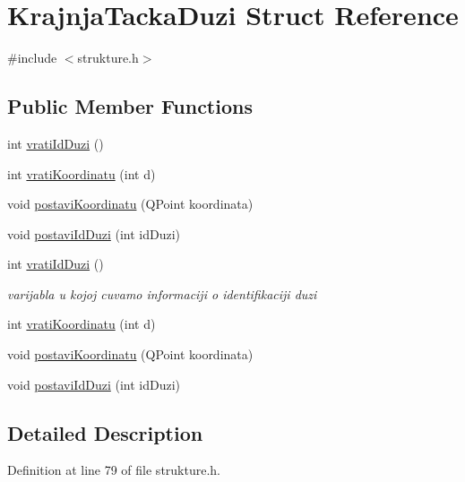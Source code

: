 \hypertarget{struct_krajnja_tacka_duzi}{\section{Krajnja\-Tacka\-Duzi Struct Reference}
\label{struct_krajnja_tacka_duzi}
}


{\ttfamily \#include $<$strukture.\-h$>$}

\subsection*{Public Member Functions}
\begin{DoxyCompactItemize}
\item 
int \hyperlink{struct_krajnja_tacka_duzi_a8742c9111c3d47d4edf758d7a986b12b}{vrati\-Id\-Duzi} ()
\item 
int \hyperlink{struct_krajnja_tacka_duzi_a73f22332c57426edefcf872f97954851}{vrati\-Koordinatu} (int d)
\item 
void \hyperlink{struct_krajnja_tacka_duzi_a9583e853bfe7708fc9e7b5c285ae2e62}{postavi\-Koordinatu} (Q\-Point koordinata)
\item 
void \hyperlink{struct_krajnja_tacka_duzi_a988a6f6db53f5b25b26d89a772ba22b5}{postavi\-Id\-Duzi} (int id\-Duzi)
\item 
int \hyperlink{struct_krajnja_tacka_duzi_a8742c9111c3d47d4edf758d7a986b12b}{vrati\-Id\-Duzi} ()
\begin{DoxyCompactList}\small\item\em varijabla u kojoj cuvamo informaciji o identifikaciji duzi \end{DoxyCompactList}\item 
int \hyperlink{struct_krajnja_tacka_duzi_a73f22332c57426edefcf872f97954851}{vrati\-Koordinatu} (int d)
\item 
void \hyperlink{struct_krajnja_tacka_duzi_a9583e853bfe7708fc9e7b5c285ae2e62}{postavi\-Koordinatu} (Q\-Point koordinata)
\item 
void \hyperlink{struct_krajnja_tacka_duzi_a988a6f6db53f5b25b26d89a772ba22b5}{postavi\-Id\-Duzi} (int id\-Duzi)
\end{DoxyCompactItemize}


\subsection{Detailed Description}


Definition at line 79 of file strukture.\-h.



